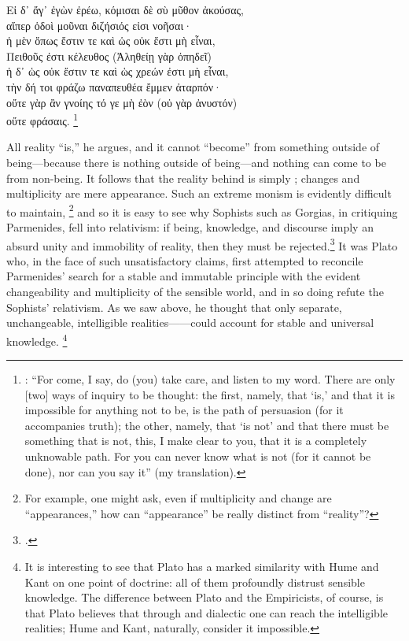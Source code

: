 \begin{greekQuotation}\noindent
Εἰ δ᾽ ἄγ᾽ ἐγὼν ἐρέω, κόμισαι δὲ σὺ μῦθον ἀκούσας,\\ 
αἵπερ ὁδοὶ μοῦναι διζήσιός εἰσι νοῆσαι·\\
ἡ μὲν ὅπως ἔστιν τε καὶ ὡς οὐκ ἔστι μὴ εἶναι,\\
Πειθοῦς ἐστι κέλευθος (Ἀληθείῃ γὰρ ὀπηδεῖ)\\
ἡ δ᾽ ὡς οὐκ ἔστιν τε καὶ ὡς χρεών ἐστι μὴ εἶναι, \\
τὴν δή τοι φράζω παναπευθέα ἔμμεν ἀταρπόν· \\
οὔτε γὰρ ἂν γνοίης τό γε μὴ ἐὸν (οὐ γὰρ ἀνυστόν) \\
οὔτε φράσαις.%
%
\footnote{\Cite[DK28b2]{dk}: ``For come, I say, do (you) take care, and listen to my word. There are only [two] ways of inquiry to be thought: the first, namely, that `is,' and that it is impossible for anything not to be, is the path of persuasion (for it accompanies truth); the other, namely, that `is not' and that there must be something that is not, this, I make clear to you, that it is a completely unknowable path. For you can never know what is not (for it cannot be done), nor can you say it'' (my translation).}
%
\end{greekQuotation}
%
All reality ``is,'' he argues, and it cannot ``become'' from something outside of being---because there is nothing outside of being---and nothing can come to be from non-being. It follows that the reality behind is simply ; changes and multiplicity are mere appearance. Such an extreme monism is evidently difficult to maintain,%
%
\footnote{For example, one might ask, even if multiplicity and change are ``appearances,'' how can ``appearance'' be really distinct from ``reality''?} and so it is easy to see why Sophists such as Gorgias, in critiquing Parmenides, fell into relativism: if being, knowledge, and discourse imply an absurd unity and immobility of reality, then they must be rejected.\footcite[93--94]{copleston:history:01} It was Plato who, in the face of such unsatisfactory claims, first attempted to reconcile Parmenides' search for a stable and immutable principle with the evident changeability and multiplicity of the sensible world, and in so doing refute the Sophists' relativism. As we saw above, he thought that only separate, unchangeable, intelligible realities------could account for stable and universal knowledge.%
%
\footnote{It is interesting to see that Plato has a marked similarity with Hume and Kant on one point of doctrine: all of them profoundly distrust sensible knowledge. The difference between Plato and the Empiricists, of course, is that Plato believes that through  and dialectic one can reach the intelligible realities; Hume and Kant, naturally, consider it impossible.}
